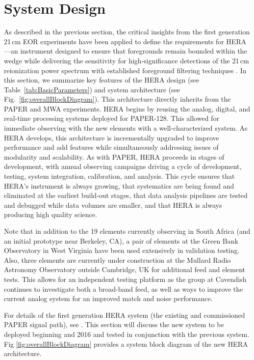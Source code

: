 \documentclass[preprint,11pt]{aastex}
\begin{document}
\section{System Design} \label{sec:design}
As described in the previous section, the critical insights from the first generation 21\,cm EOR experiments have been applied to define
the requirements for HERA---an instrument designed to ensure that foregrounds remain bounded
within the wedge while delivering the sensitivity for
high-significance detections of the 21\,cm reionization power spectrum with
established foreground filtering techniques
\citep{pober_et_al2014,greig_and_mesinger2015}.
In this section, we summarize key features of the HERA design (see Table~\ref{tab:BasicParameters}) 
and system architecture (see Fig.~\ref{fig:overallBlockDiagram}).
This architecture directly inherits from the PAPER and MWA experiments.  HERA begins by reusing the
analog, digital, and real-time processing systems deployed for PAPER-128.  
This allowed for immediate observing with the new elements with a well-characterized system.
As HERA develops, this
architecture is incrementally upgraded to improve performance and add features while simultaneously
addressing issues of modularity and scalability.  As with PAPER, HERA proceeds in stages of development,
with annual observing campaigns driving a cycle of development, testing, system integration, calibration, and analysis.
This cycle ensures that HERA's instrument is always growing, that systematics are being found and eliminated at the
earliest build-out stages, that data analysis pipelines are tested and debugged while data volumes are smaller,
and that HERA is always producing high quality science.

Note that in addition to the 19 elements currently observing in South Africa (and an initial prototype near Berkeley, CA), a pair of elements at the Green Bank Observatory in West Virginia have been used extensively in validation testing.  Also, three elements are currently under construction at the Mullard Radio Astronomy Observatory outside Cambridge, UK for additional feed and element tests.  This allows for an independent testing platform as the group at Cavendish continues to investigate both a broad-band feed, as well as ways to improve the current analog system for an improved match and noise performance.

For details of the first generation HERA system (the existing and commissioned PAPER signal path), see \cite{parsons_et_al2010}.  This section will discuss the new system to be deployed beginning and 2016 and tested in conjunction with the previous system.  Fig \ref{fig:overallBlockDiagram} provides a system block diagram of the new HERA architecture.
\end{document}

